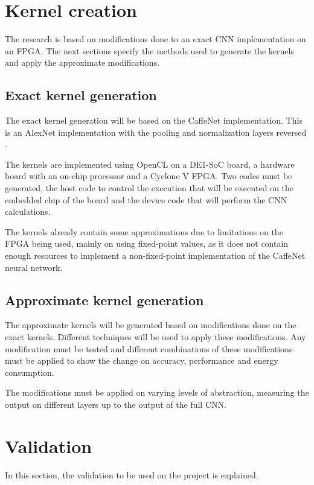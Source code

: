 \section{Kernel creation}

The research is based on modifications done to an exact CNN implementation on an FPGA. 
The next sections specify the methods used to generate the kernels and apply the 
approximate modifications.

\subsection{Exact kernel generation}

The exact kernel generation will be based on the CaffeNet implementation. This is an AlexNet implementation
with the pooling and normalization layers reversed \cite{donahue2012bvlc}. 

The kernels are implemented using OpenCL on a DE1-SoC board, a hardware board with an on-chip processor and
a Cyclone V FPGA. Two codes must be generated, the host code to control the execution that will be executed on
the embedded chip of the board and the device code that will perform the CNN calculations.

The kernels already contain some approximations due to limitations on the FPGA being used, mainly on using
fixed-point values, as it does
not contain enough resources to implement a non-fixed-point implementation of the CaffeNet neural network.

\subsection{Approximate kernel generation}

The approximate kernels will be generated based on modifications done on the exact kernels.
Different techniques will be used to apply these modifications. Any modification must be tested
and different combinations of these modifications must be applied to show the change on accuracy,
performance and energy consumption.

The modifications must be applied on varying levels of abstraction, measuring the output on different
layers up to the output of the full CNN.

\section{Validation}

In this section, the validation to be used on the project is explained.

